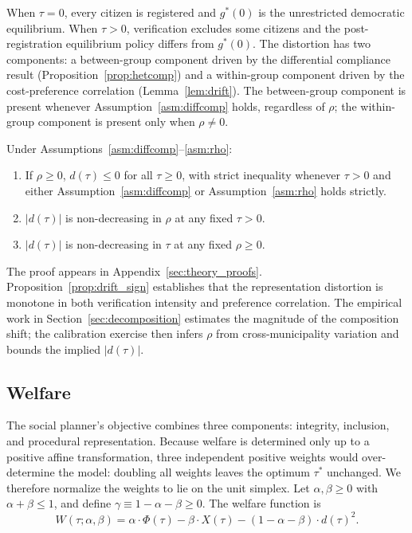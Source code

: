 When $\tau = 0$, every citizen is registered and $g^*(0)$ is the unrestricted democratic equilibrium. When $\tau > 0$, verification excludes some citizens and the post-registration equilibrium policy differs from $g^*(0)$. The distortion has two components: a between-group component driven by the differential compliance result (Proposition~\ref{prop:hetcomp}) and a within-group component driven by the cost-preference correlation (Lemma~\ref{lem:drift}). The between-group component is present whenever Assumption~\ref{asm:diffcomp} holds, regardless of $\rho$; the within-group component is present only when $\rho \neq 0$.

\begin{proposition}
\label{prop:drift_sign}
Under Assumptions~\ref{asm:diffcomp}--\ref{asm:rho}:
\begin{enumerate}
    \item[(i)] If $\rho \geq 0$, $d(\tau) \leq 0$ for all $\tau \geq 0$, with strict inequality whenever $\tau > 0$ and either Assumption~\ref{asm:diffcomp} or Assumption~\ref{asm:rho} holds strictly.
    \item[(ii)] $|d(\tau)|$ is non-decreasing in $\rho$ at any fixed $\tau > 0$.
    \item[(iii)] $|d(\tau)|$ is non-decreasing in $\tau$ at any fixed $\rho \geq 0$.
\end{enumerate}
\end{proposition}

The proof appears in Appendix~\ref{sec:theory_proofs}. Proposition~\ref{prop:drift_sign} establishes that the representation distortion is monotone in both verification intensity and preference correlation. The empirical work in Section~\ref{sec:decomposition} estimates the magnitude of the composition shift; the calibration exercise then infers $\rho$ from cross-municipality variation and bounds the implied $|d(\tau)|$.

\subsection{Welfare}
\label{ssec:welfare}

The social planner's objective combines three components: integrity, inclusion, and procedural representation. Because welfare is determined only up to a positive affine transformation, three independent positive weights would over-determine the model: doubling all weights leaves the optimum $\tau^*$ unchanged. We therefore normalize the weights to lie on the unit simplex. Let $\alpha, \beta \geq 0$ with $\alpha + \beta \leq 1$, and define $\gamma \equiv 1 - \alpha - \beta \geq 0$. The welfare function is
\begin{equation}
W(\tau; \alpha, \beta) = \alpha \cdot \Phi(\tau) - \beta \cdot X(\tau) - (1 - \alpha - \beta) \cdot d(\tau)^2.
\label{eq:welfare}
\end{equation}

